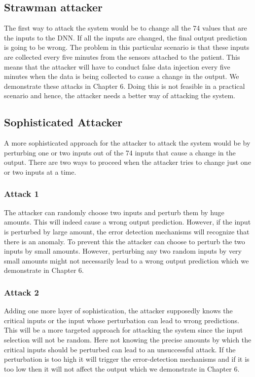 \subsection{Strawman attacker}
The first way to attack the system would be to change all the 74 values that are the inputs to the DNN.
 If all the inputs are changed, the final output prediction is going to be wrong. The problem in this particular scenario is that these inputs are collected every five minutes from the sensors attached to the patient. 
 This means that the attacker will have to conduct false data injection every five minutes when the data is being collected to cause a change in the output.
 We demonstrate these attacks in Chapter 6.
  Doing this is not feasible in a practical scenario and hence, the attacker needs a better way of attacking the system. 

\subsection{Sophisticated Attacker}
A more sophisticated approach for the attacker to attack the system would be by perturbing one or two inputs out of the 74 inputs that cause a change in the output. There are two ways to proceed when the attacker tries to change just one or two inputs at a time. 

\subsubsection{Attack 1}
The attacker can randomly choose two inputs and perturb them by huge amounts. 
This will indeed cause a wrong output prediction. 
However, if the input is perturbed by large amount, the error detection mechanisms will recognize that there is an anomaly. 
To prevent this the attacker can choose to perturb the two inputs by small amounts. 
However, perturbing any two random inputs by very small amounts might not necessarily lead to a wrong output prediction which we demonstrate in Chapter 6. 

\subsubsection{Attack 2}
Adding one more layer of sophistication, the attacker supposedly knows the critical inputs or the input whose perturbation can lead to wrong predictions. This will be a more targeted approach for attacking the system since the input selection will not be random. 
Here not knowing the precise amounts by which the critical inputs should be perturbed can lead to an unsuccessful attack. 
If the perturbation is too high it will trigger the error-detection mechanisms and if it is too low then it will not affect the output which we demonstrate  in Chapter 6. 

